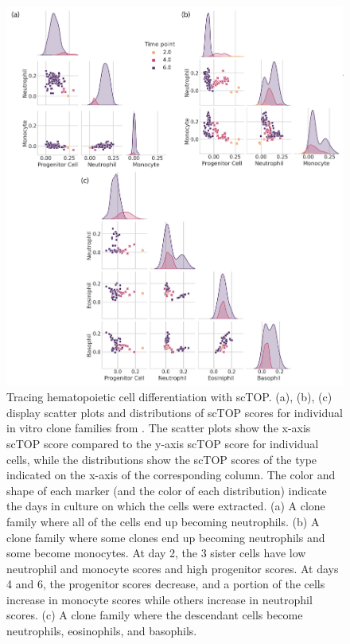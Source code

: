 \documentclass[aps,superscriptaddress, notitlepage,longbibliography]{revtex4-1}
\begin{document}
\begin{figure}
	\centering
		\includegraphics[scale=0.75]{figs/hem. clone families.png}
	\caption{Tracing hematopoietic cell differentiation with scTOP. (a), (b), (c) display scatter plots and distributions of scTOP scores for individual in vitro clone families from  \cite{weinreb_lineage_2020}. The scatter plots show the x-axis scTOP score compared to the y-axis scTOP score for individual cells, while the distributions show the scTOP scores of the type indicated on the x-axis of the corresponding column. The color and shape of each marker (and the color of each distribution) indicate the days in culture on which the cells were extracted. (a) A clone family where all of the cells end up becoming neutrophils. (b) A clone family where some clones end up becoming neutrophils and some become monocytes. At day 2, the 3 sister cells have low neutrophil and monocyte scores and high progenitor scores. At days 4 and 6, the progenitor scores decrease, and a portion of the cells increase in monocyte scores while others increase in neutrophil scores. (c) A clone family where the descendant cells become neutrophils, eosinophils, and basophils.}
	\label{hem clones}
\end{figure}
\end{document}
